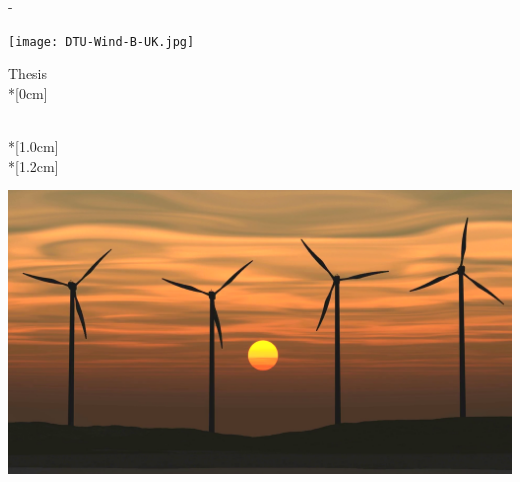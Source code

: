 \thispagestyle{empty}             %
\calccentering{\unitlength}
\begin{adjustwidth*}{\unitlength}{-\unitlength}
    \begin{adjustwidth}{-0.5cm}{-0.5cm}
        \sffamily
        \noindent
        \texttt{[image: DTU-Wind-B-UK.jpg]} \hfill
        \begin{flushright}
        	\thesistypeabbr{} Thesis\\*[0cm]
        \end{flushright}

		\begin{vplace}[1.0]
			\noindent
			\newline \newline
			\huge \thesistitle{}\\*[1.0cm]
			\LARGE \thesissubtitle{}\\*[1.2cm]

			\noindent
		    \includegraphics[width=1.0\textwidth]{graphics/wind_farm_sunset.png} \vfill
		\end{vplace}
        

\end{adjustwidth}
\end{adjustwidth*}

